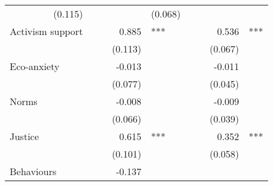 \documentclass{article}
\begin{document}
\begin{table}[!h]
\begin{tabular}{lllllllll}
  \multicolumn{1}{r}{(0.115)} &
  \multicolumn{1}{l}{} &
  \multicolumn{1}{r}{} &
  \multicolumn{1}{l}{} &
  \multicolumn{1}{r}{(0.068)} &
  \multicolumn{1}{l}{} \\
\multicolumn{1}{l}{Activism support} &
  \multicolumn{1}{r}{} &
  \multicolumn{1}{l}{} &
  \multicolumn{1}{r}{0.885} &
  \multicolumn{1}{l}{***} &
  \multicolumn{1}{r}{} &
  \multicolumn{1}{l}{} &
  \multicolumn{1}{r}{0.536} &
  \multicolumn{1}{l}{***} \\
\multicolumn{1}{l}{} &
  \multicolumn{1}{r}{} &
  \multicolumn{1}{l}{} &
  \multicolumn{1}{r}{(0.113)} &
  \multicolumn{1}{l}{} &
  \multicolumn{1}{r}{} &
  \multicolumn{1}{l}{} &
  \multicolumn{1}{r}{(0.067)} &
  \multicolumn{1}{l}{} \\
\multicolumn{1}{l}{Eco-anxiety} &
  \multicolumn{1}{r}{} &
  \multicolumn{1}{l}{} &
  \multicolumn{1}{r}{-0.013} &
  \multicolumn{1}{l}{} &
  \multicolumn{1}{r}{} &
  \multicolumn{1}{l}{} &
  \multicolumn{1}{r}{-0.011} &
  \multicolumn{1}{l}{} \\
\multicolumn{1}{l}{} &
  \multicolumn{1}{r}{} &
  \multicolumn{1}{l}{} &
  \multicolumn{1}{r}{(0.077)} &
  \multicolumn{1}{l}{} &
  \multicolumn{1}{r}{} &
  \multicolumn{1}{l}{} &
  \multicolumn{1}{r}{(0.045)} &
  \multicolumn{1}{l}{} \\
\multicolumn{1}{l}{Norms} &
  \multicolumn{1}{r}{} &
  \multicolumn{1}{l}{} &
  \multicolumn{1}{r}{-0.008} &
  \multicolumn{1}{l}{} &
  \multicolumn{1}{r}{} &
  \multicolumn{1}{l}{} &
  \multicolumn{1}{r}{-0.009} &
  \multicolumn{1}{l}{} \\
\multicolumn{1}{l}{} &
  \multicolumn{1}{r}{} &
  \multicolumn{1}{l}{} &
  \multicolumn{1}{r}{(0.066)} &
  \multicolumn{1}{l}{} &
  \multicolumn{1}{r}{} &
  \multicolumn{1}{l}{} &
  \multicolumn{1}{r}{(0.039)} &
  \multicolumn{1}{l}{} \\
\multicolumn{1}{l}{Justice} &
  \multicolumn{1}{r}{} &
  \multicolumn{1}{l}{} &
  \multicolumn{1}{r}{0.615} &
  \multicolumn{1}{l}{***} &
  \multicolumn{1}{r}{} &
  \multicolumn{1}{l}{} &
  \multicolumn{1}{r}{0.352} &
  \multicolumn{1}{l}{***} \\
\multicolumn{1}{l}{} &
  \multicolumn{1}{r}{} &
  \multicolumn{1}{l}{} &
  \multicolumn{1}{r}{(0.101)} &
  \multicolumn{1}{l}{} &
  \multicolumn{1}{r}{} &
  \multicolumn{1}{l}{} &
  \multicolumn{1}{r}{(0.058)} &
  \multicolumn{1}{l}{} \\
\multicolumn{1}{l}{Behaviours} &
  \multicolumn{1}{r}{} &
  \multicolumn{1}{l}{} &
  \multicolumn{1}{r}{-0.137} &
  \multicolumn{1}{l}{} &

\end{tabular}
\end{table}
\end{document}
